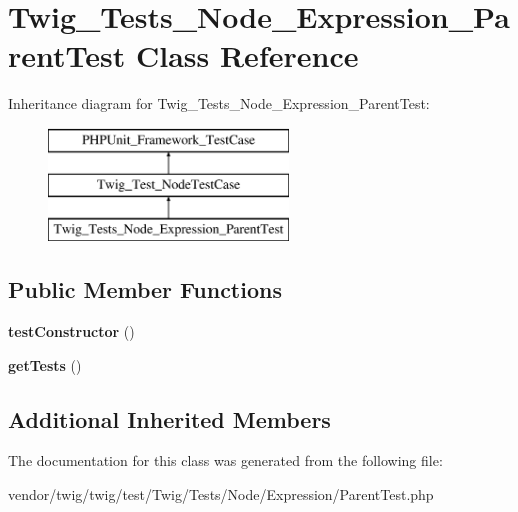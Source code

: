 \hypertarget{classTwig__Tests__Node__Expression__ParentTest}{}\section{Twig\+\_\+\+Tests\+\_\+\+Node\+\_\+\+Expression\+\_\+\+Parent\+Test Class Reference}
\label{classTwig__Tests__Node__Expression__ParentTest}
Inheritance diagram for Twig\+\_\+\+Tests\+\_\+\+Node\+\_\+\+Expression\+\_\+\+Parent\+Test\+:\begin{figure}[H]
\begin{center}
\leavevmode
\includegraphics[height=3.000000cm]{classTwig__Tests__Node__Expression__ParentTest}
\end{center}
\end{figure}
\subsection*{Public Member Functions}
\begin{DoxyCompactItemize}
\item 
{\bfseries test\+Constructor} ()\hypertarget{classTwig__Tests__Node__Expression__ParentTest_a4af464237f9a4db4c2c70369662c5fe7}{}\label{classTwig__Tests__Node__Expression__ParentTest_a4af464237f9a4db4c2c70369662c5fe7}

\item 
{\bfseries get\+Tests} ()\hypertarget{classTwig__Tests__Node__Expression__ParentTest_af874e3bb9df84ae4afa71ef95724c2b1}{}\label{classTwig__Tests__Node__Expression__ParentTest_af874e3bb9df84ae4afa71ef95724c2b1}

\end{DoxyCompactItemize}
\subsection*{Additional Inherited Members}


The documentation for this class was generated from the following file\+:\begin{DoxyCompactItemize}
\item 
vendor/twig/twig/test/\+Twig/\+Tests/\+Node/\+Expression/Parent\+Test.\+php\end{DoxyCompactItemize}
